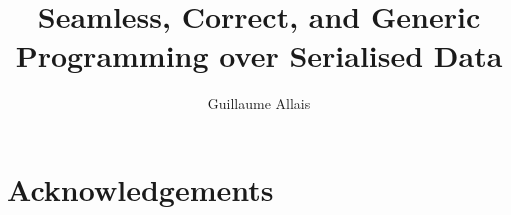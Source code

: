 \documentclass{jfp}
\begin{document}

\totalpg{\pageref{lastpage01}}

\title{Seamless, Correct, and Generic Programming over Serialised Data}

\begin{authgrp}
\author{Guillaume Allais}
\end{authgrp}




\maketitle



















\section*{Acknowledgements}





\appendix



%

\label{lastpage01}
\end{document}
